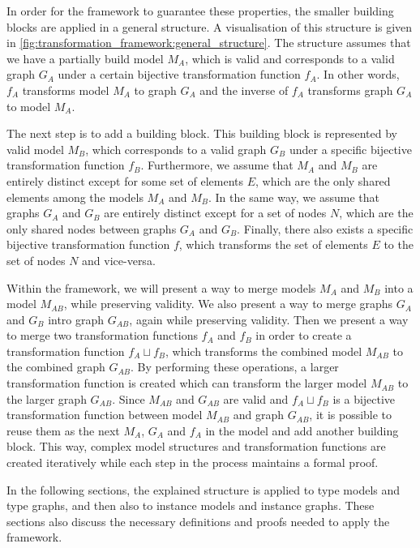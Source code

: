 In order for the framework to guarantee these properties, the smaller building blocks are applied in a general structure. A visualisation of this structure is given in \cref{fig:transformation_framework:general_structure}. The structure assumes that we have a partially build model $M_A$, which is valid and corresponds to a valid graph $G_A$ under a certain bijective transformation function $f_A$. In other words, $f_A$ transforms model $M_A$ to graph $G_A$ and the inverse of $f_A$ transforms graph $G_A$ to model $M_A$.

The next step is to add a building block. This building block is represented by valid model $M_B$, which corresponds to a valid graph $G_B$ under a specific bijective transformation function $f_B$. Furthermore, we assume that $M_A$ and $M_B$ are entirely distinct except for some set of elements $E$, which are the only shared elements among the models $M_A$ and $M_B$. In the same way, we assume that graphs $G_A$ and $G_B$ are entirely distinct except for a set of nodes $N$, which are the only shared nodes between graphs $G_A$ and $G_B$. Finally, there also exists a specific bijective transformation function $f$, which transforms the set of elements $E$ to the set of nodes $N$ and vice-versa.

Within the framework, we will present a way to merge models $M_A$ and $M_B$ into a model $M_{AB}$, while preserving validity. We also present a way to merge graphs $G_A$ and $G_B$ intro graph $G_{AB}$, again while preserving validity. Then we present a way to merge two transformation functions $f_A$ and $f_B$ in order to create a transformation function $f_{A} \sqcup f_{B}$, which transforms the combined model $M_{AB}$ to the combined graph $G_{AB}$. By performing these operations, a larger transformation function is created which can transform the larger model $M_{AB}$ to the larger graph $G_{AB}$. Since $M_{AB}$ and $G_{AB}$ are valid and $f_{A} \sqcup f_{B}$ is a bijective transformation function between model $M_{AB}$ and graph $G_{AB}$, it is possible to reuse them as the next $M_{A}$, $G_{A}$ and $f_{A}$ in the model and add another building block. This way, complex model structures and transformation functions are created iteratively while each step in the process maintains a formal proof.

In the following sections, the explained structure is applied to type models and type graphs, and then also to instance models and instance graphs. These sections also discuss the necessary definitions and proofs needed to apply the framework.